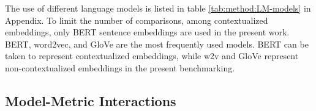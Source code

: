 


The use of different language models is listed in table \ref{tab:method:LM-models} in Appendix. To limit the number of comparisons, among contextualized embeddings, only BERT sentence embeddings are used in the present work. 
BERT, word2vec, and GloVe are the most frequently used models. BERT can be taken to represent contextualized embeddings, while w2v and GloVe represent non-contextualized embeddings in the present benchmarking.


\subsection{Model-Metric Interactions}
\label{sec:review:LM:interaction}

